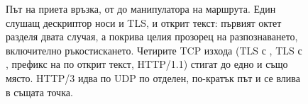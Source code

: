 \begin{figure}[htbp]
\caption{Път на приета връзка, от  до манипулатора на маршрута. Един
слушащ дескриптор носи и TLS, и открит текст: първият октет разделя двата случая, а
 покрива целия прозорец на разпознаването, включително ръкостискането.
Четирите TCP изхода (TLS с , TLS с , префикс на  по
открит текст, HTTP/1.1) стигат до едно и също място. HTTP/3 идва по UDP по отделен,
по-кратък път и се влива в същата точка.}
\label{fig:demux_path}
\end{figure}
